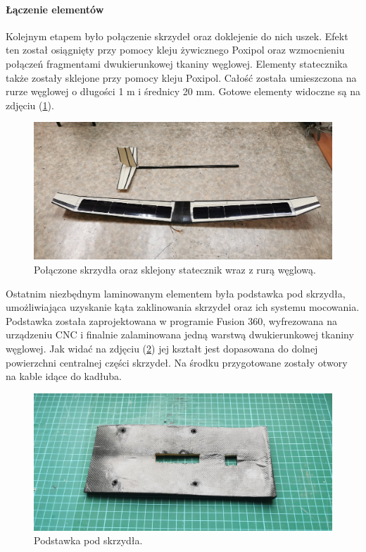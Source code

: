 \documentclass[12pt, a4paper]{article}
\let\oldref\ref
\renewcommand{\ref}[1]{(\oldref{#1})}
\begin{document}
\FloatBarrier
\paragraph{Łączenie elementów}\mbox{}

Kolejnym etapem było połączenie skrzydeł oraz doklejenie do nich uszek. Efekt ten został osiągnięty przy pomocy kleju żywicznego Poxipol oraz wzmocnieniu połączeń fragmentami dwukierunkowej tkaniny węglowej. Elementy statecznika także zostały sklejone przy pomocy kleju Poxipol. Całość została umieszczona na rurze węglowej o długości 1 m i średnicy 20 mm. Gotowe elementy widoczne są na zdjęciu \ref{fig:sklejone}.

 \begin{figure}[ht]
    \centering
    \includegraphics[width=1\textwidth]{budowa13}
    \caption{Połączone skrzydła oraz sklejony statecznik wraz z rurą węglową.}
    \label{fig:sklejone}
\end{figure}

Ostatnim niezbędnym laminowanym elementem była podstawka pod skrzydła, umożliwiająca uzyskanie kąta zaklinowania skrzydeł oraz ich systemu mocowania. Podstawka została zaprojektowana w programie Fusion 360, wyfrezowana na urządzeniu CNC i finalnie zalaminowana jedną warstwą dwukierunkowej tkaniny węglowej. Jak widać na zdjęciu \ref{fig:podstawka} jej kształt jest dopasowana do dolnej powierzchni centralnej części skrzydeł. Na środku przygotowane zostały otwory na kable idące do kadłuba.

 \begin{figure}[ht]
    \centering
    \includegraphics[width=1\textwidth]{podstawka}
    \caption{Podstawka pod skrzydła.}
    \label{fig:podstawka}
\end{figure}
\end{document}
